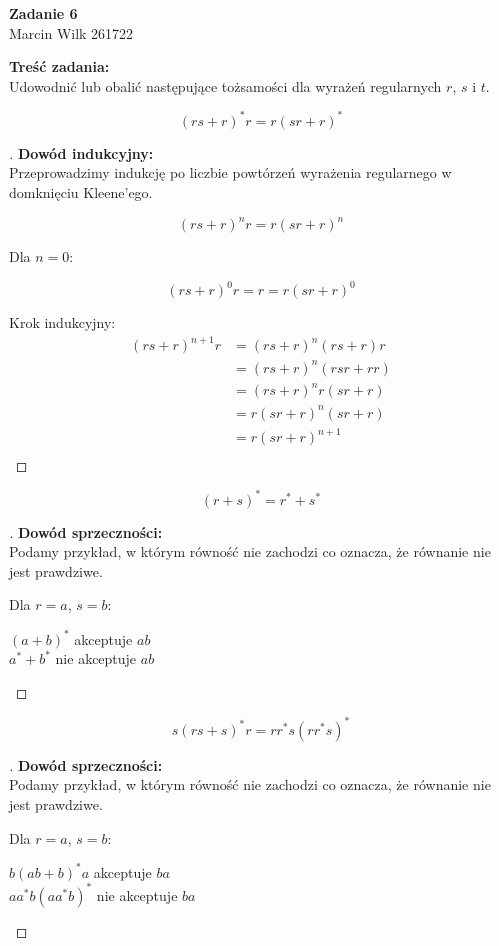 \documentclass{article}
\begin{document}
\begin{center}
    \textbf{\LARGE Zadanie 6} \\
    {\large Marcin Wilk 261722} \\
\end{center}

\noindent \textbf{Treść zadania:} \\
Udowodnić lub obalić następujące tożsamości dla wyrażeń regularnych $r$, $s$ i $t$.

\[(rs + r)^*r = r(sr + r)^*\]

\begin{proof}[\unskip\nopunct]
\noindent \textbf{Dowód indukcyjny:} \\
Przeprowadzimy indukcję po liczbie powtórzeń wyrażenia regularnego w domknięciu Kleene'ego.

\[(rs + r)^nr = r(sr + r)^n\]

\noindent Dla $n = 0$:

\[(rs + r)^0r = r = r(sr + r)^0\]

\noindent Krok indukcyjny:
\begin{align*}
    (rs + r)^{n+1}r & = (rs + r)^n(rs + r)r \\
    & = (rs + r)^n(rsr + rr) \\
    & = (rs + r)^nr(sr + r) \\
    & = r(sr + r)^n(sr + r) \\
    & = r(sr + r)^{n + 1} \\
\end{align*}
\end{proof}

\[(r + s)^* = r^* + s^*\]

\begin{proof}[\unskip\nopunct]
\noindent \textbf{Dowód sprzeczności:} \\
Podamy przykład, w którym równość nie zachodzi co oznacza, że równanie nie jest prawdziwe.

\noindent Dla $r = a$, $s = b$:

\begin{center}
    $(a + b)^*$ akceptuje $ab$ \\[\baselineskip]
    $a^* + b^*$ nie akceptuje $ab$ \\[2\baselineskip]
\end{center}
\end{proof}

\pagebreak

\[s(rs + s)^*r = rr^*s(rr^*s)^*\]

\begin{proof}[\unskip\nopunct]
\noindent \textbf{Dowód sprzeczności:} \\
Podamy przykład, w którym równość nie zachodzi co oznacza, że równanie nie jest prawdziwe.

\noindent Dla $r = a$, $s = b$:

\begin{center}
    $b(ab + b)^*a$ akceptuje $ba$ \\[\baselineskip]
    $aa^*b(aa^*b)^*$ nie akceptuje $ba$
\end{center}
\end{proof}
\end{document}
